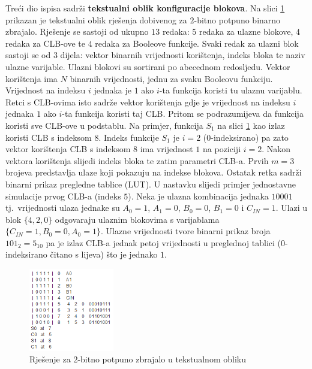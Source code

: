 \documentclass[times, utf8, diplomski]{fer}
\begin{document}
Treći dio ispisa sadrži \textbf{tekstualni oblik konfiguracije blokova}. Na slici \ref{fig:solution-text} prikazan je tekstualni oblik rješenja dobivenog za $2$-bitno potpuno binarno zbrajalo. Rješenje se sastoji od ukupno $13$ redaka: $5$ redaka za ulazne blokove, $4$ redaka za CLB-ove te $4$ redaka za Booleove funkcije. Svaki redak za ulazni blok sastoji se od $3$ dijela: vektor binarnih vrijednosti korištenja, indeks bloka te naziv ulazne varijable. Ulazni blokovi su sortirani po  abecednom redosljedu. Vektor korištenja ima $N$ binarnih vrijednosti, jednu za svaku Booleovu funkciju. Vrijednost na indeksu $i$ jednaka je $1$ ako $i$-ta funkcija koristi tu ulaznu varijablu. Retci s CLB-ovima isto sadrže vektor korištenja gdje je vrijednost na indeksu $i$ jednaka $1$ ako $i$-ta funkcija koristi taj CLB. Pritom se podrazumijeva da funkcija koristi sve CLB-ove u podstablu. Na primjer, funkcija $S_{1}$ na slici \ref{fig:solution-text} kao izlaz koristi CLB s indeksom $8$. Indeks funkcije $S_{1}$ je $i=2$ ($0$-indeksirano) pa zato vektor korištenja CLB s indeksom $8$ ima vrijednost $1$ na poziciji $i=2$. Nakon vektora korištenja slijedi indeks bloka te zatim parametri CLB-a. Prvih $m=3$ brojeva predstavlja ulaze koji pokazuju na indekse blokova. Ostatak retka sadrži binarni prikaz pregledne tablice (LUT). U nastavku slijedi primjer jednostavne simulacije prvog CLB-a (indeks $5$). Neka je ulazna kombinacija jednaka $10001$ tj.~vrijednosti ulaza jednake su $A_{0}=1$, $A_{1}=0$, $B_{0}=0$, $B_{1}=0$ i $C_{IN}=1$. Ulazi u blok $\{4, 2, 0\}$ odgovaraju ulaznim blokovima s varijablama $\{C_{IN}=1, B_{0}=0, A_{0}=1\}$. Ulazne vrijednosti tvore binarni prikaz broja $101_{2}=5_{10}$ pa je izlaz CLB-a jednak petoj vrijednosti u preglednoj tablici ($0$-indeksirano čitano s lijeva) što je jednako $1$.

\begin{figure}[htb]
	\centering
	\includegraphics[width=0.33\textwidth]{img/solution_text.png}
	\caption{Rješenje za $2$-bitno potpuno zbrajalo u tekstualnom obliku}
	\label{fig:solution-text}
\end{figure}
\end{document}
